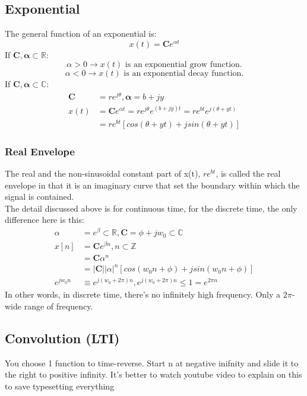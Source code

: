 \subsection*{Exponential}
The general function of an exponential is:
\[x(t)=\mathbf{C}e^{\alpha t}\]
If $\mathbf{C, \alpha}\subset \mathbb{R}:$
\[\alpha > 0 \rightarrow x(t)\text{ is an exponential grow function.}\]
\[\alpha < 0 \rightarrow x(t)\text{ is an exponential decay function.}\]
If $\mathbf{C, \alpha}\subset \mathbb{C}:$
\begin{align*}
    \mathbf{C} &= re^{j\theta}, \mathbf{\alpha} = b+jy \\
    x(t) &= \mathbf{C}e^{\alpha t} = re^{j\theta}e^{(b+jy) t} = re^{bt}e^{j(\theta+yt)} \\
         &= re^{bt} [cos(\theta+yt)+jsin(\theta+yt)]
\end{align*}
\subsubsection*{Real Envelope} The real and the non-sinusoidal constant part of x(t), $re^{bt}$, is called the real envelope in that it is an imaginary curve that set the boundary within which the signal is contained. \\
The detail discussed above is for continuous time, for the discrete time, the only difference here is this:
\begin{align*}
    \alpha &= e^{\beta} \subset \mathbb{R}, \mathbf{C}=\phi + jw_0\subset \mathbb{C}\\
    x[n] &= \mathbf{C}e^{\beta n}, n \subset \mathbb{Z} \\
         &= \mathbf{C}\alpha^n \\
         &= |\mathbf{C}||\alpha|^n [cos(w_0n+\phi)+jsin(w_0n+\phi)] \\
    e^{jw_0n} &\equiv e^{j(w_0 + 2\pi)n}, e^{j(w_0+2\pi)n} \leq 1 = e^{2\pi n}
\end{align*}
In other words, in discrete time, there's no infinitely high frequency. Only a $2\pi$-wide range of frequency. 

\subsection*{Convolution (LTI)}
You choose 1 function to time-reverse. Start n at negative inifnity and slide it to the right to positive infinity. It's better to watch youtube video to explain on this to save typesetting everything